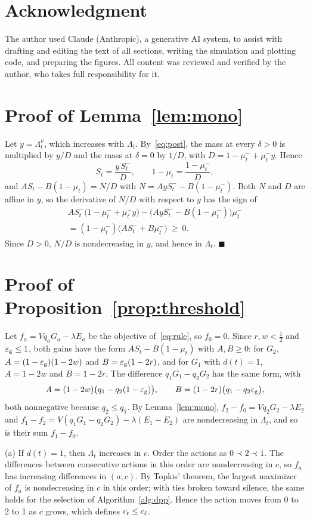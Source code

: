 \documentclass[journal]{IEEEtran}
\theoremstyle{remark}
\newcommand{\lab}{\ell}
\newcommand{\ee}{\varepsilon}
\begin{document}
\section*{Acknowledgment}
The author used Claude (Anthropic), a generative AI system, to assist with drafting and editing the text of all sections, writing the simulation and plotting code, and preparing the figures. All content was reviewed and verified by the author, who takes full responsibility for it.

\appendices
\section{Proof of Lemma~\ref{lem:mono}}\label{app:mono}
Let $y=\Lambda_t^{\nu}$, which increases with $\Lambda_t$. By~\eqref{eq:post}, the mass at every $\delta>0$ is multiplied by $y/D$ and the mass at $\delta=0$ by $1/D$, with $D=1-\mu^-_t+\mu^-_ty$. Hence
\[
S_t=\frac{y\,S^-_t}{D},\qquad 1-\mu_t=\frac{1-\mu^-_t}{D},
\]
and $AS_t-B(1-\mu_t)=N/D$ with $N=AyS^-_t-B(1-\mu^-_t)$. Both $N$ and $D$ are affine in $y$, so the derivative of $N/D$ with respect to $y$ has the sign of
\begin{multline*}
AS^-_t\big(1-\mu^-_t+\mu^-_ty\big)-\big(AyS^-_t-B(1-\mu^-_t)\big)\mu^-_t\\
=(1-\mu^-_t)\big(AS^-_t+B\mu^-_t\big)\ \ge\ 0.
\end{multline*}
Since $D>0$, $N/D$ is nondecreasing in $y$, and hence in $\Lambda_t$. \hfill$\blacksquare$

\section{Proof of Proposition~\ref{prop:threshold}}\label{app:threshold}
Let $f_a=Vq_aG_a-\lambda E_a$ be the objective of~\eqref{eq:rule}, so $f_0=0$. Since $r,w<\frac12$ and $\ee_{\rm g}\le1$, both gains have the form $AS_t-B(1-\mu_t)$ with $A,B\ge0$: for $G_2$, $A=(1-\ee_{\rm g})(1-2w)$ and $B=\ee_{\rm g}(1-2r)$, and for $G_1$ with $d(t)=1$, $A=1-2w$ and $B=1-2r$. The difference $q_1G_1-q_2G_2$ has the same form, with
\[
A=(1-2w)\big(q_1-q_2(1-\ee_{\rm g})\big),\qquad B=(1-2r)\big(q_1-q_2\ee_{\rm g}\big),
\]
both nonnegative because $q_2\le q_1$. By Lemma~\ref{lem:mono}, $f_2-f_0=Vq_2G_2-\lambda E_2$ and $f_1-f_2=V(q_1G_1-q_2G_2)-\lambda(E_1-E_2)$ are nondecreasing in $\Lambda_t$, and so is their sum $f_1-f_0$.

(a) If $d(t)=1$, then $\Lambda_t$ increases in $c$. Order the actions as $0\prec2\prec1$. The differences between consecutive actions in this order are nondecreasing in $c$, so $f_a$ has increasing differences in $(a,c)$. By Topkis' theorem, the largest maximizer of $f_a$ is nondecreasing in $c$ in this order; with ties broken toward silence, the same holds for the selection of Algorithm~\ref{alg:dpp}. Hence the action moves from 0 to 2 to 1 as $c$ grows, which defines $c_{\rm r}\le c_{\lab}$.
\end{document}
